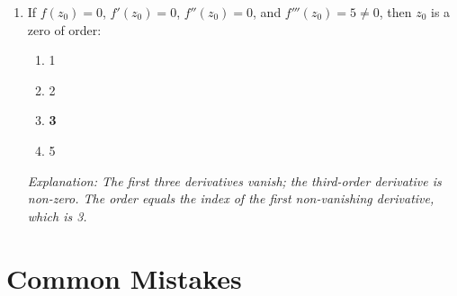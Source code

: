 \documentclass[12pt,a4paper]{article}
\begin{document}
\begin{enumerate}[label=\textbf{MCQ\arabic*.}]
\item If $f(z_0)=0$, $f'(z_0)=0$, $f''(z_0)=0$, and $f'''(z_0)=5\neq 0$, then $z_0$ is a zero
of order:
\begin{enumerate}[label=(\alph*)]
  \item 1
  \item 2
  \item \textbf{3}
  \item 5
\end{enumerate}
\textit{Explanation: The first three derivatives vanish; the third-order derivative is non-zero.
The order equals the index of the first non-vanishing derivative, which is 3.}

\end{enumerate}

\section{Common Mistakes}
\end{document}
